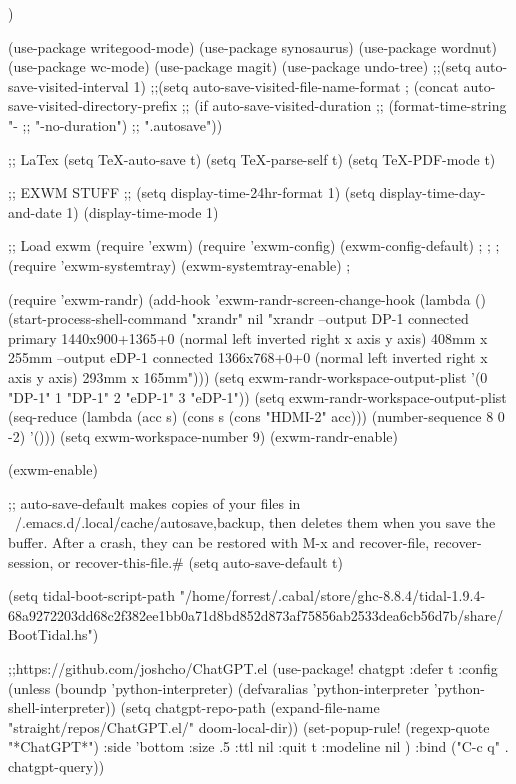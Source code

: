 {{{{{{  )

(use-package writegood-mode)
(use-package synosaurus)
(use-package wordnut)
(use-package wc-mode)
(use-package magit)
(use-package undo-tree)
;;(setq auto-save-visited-interval 1)
;;(setq auto-save-visited-file-name-format
  ;    (concat auto-save-visited-directory-prefix
   ;;          (if auto-save-visited-duration
   ;;               (format-time-string "-%
    ;;            "-no-duration")
      ;;        ".autosave"))




;; LaTex
(setq TeX-auto-save t)
(setq TeX-parse-self t)
(setq TeX-PDF-mode t)

;; EXWM STUFF
;;
(setq display-time-24hr-format 1)
(setq display-time-day-and-date 1)
(display-time-mode 1)



;; Load exwm
 (require 'exwm)
 (require 'exwm-config)
 (exwm-config-default)
;
;
;
(require 'exwm-systemtray)
(exwm-systemtray-enable)
;


(require 'exwm-randr)
(add-hook 'exwm-randr-screen-change-hook
          (lambda ()
            (start-process-shell-command
             "xrandr" nil "xrandr --output DP-1 connected primary 1440x900+1365+0 (normal left inverted right x axis y axis) 408mm x 255mm --output eDP-1 connected 1366x768+0+0 (normal left inverted right x axis y axis) 293mm x 165mm")))
(setq exwm-randr-workspace-output-plist '(0 "DP-1" 1 "DP-1" 2 "eDP-1" 3 "eDP-1"))
(setq exwm-randr-workspace-output-plist (seq-reduce (lambda (acc s) (cons s (cons "HDMI-2" acc))) (number-sequence 8 0 -2) '()))
(setq exwm-workspace-number 9)
(exwm-randr-enable)

(exwm-enable)

;;  auto-save-default makes copies of your files in ~/.emacs.d/.local/cache/{autosave,backup}, then deletes them when you save the buffer. After a crash, they can be restored with M-x and recover-file, recover-session, or recover-this-file.#
(setq auto-save-default t)




(setq tidal-boot-script-path "/home/forrest/.cabal/store/ghc-8.8.4/tidal-1.9.4-68a9272203dd68c2f382ee1bb0a71d8bd852d873af75856ab2533dea6cb56d7b/share/BootTidal.hs")



;;https://github.com/joshcho/ChatGPT.el
(use-package! chatgpt
  :defer t
  :config
  (unless (boundp 'python-interpreter)
   (defvaralias 'python-interpreter 'python-shell-interpreter))
  (setq chatgpt-repo-path (expand-file-name "straight/repos/ChatGPT.el/" doom-local-dir))
(set-popup-rule! (regexp-quote "*ChatGPT*")
  :side 'bottom :size .5 :ttl nil :quit t :modeline nil )
  :bind ("C-c q" . chatgpt-query))


}}}}}}
